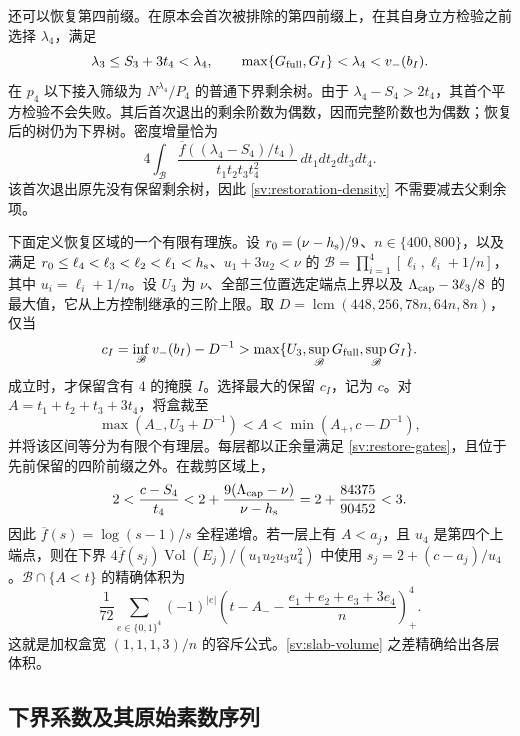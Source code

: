 还可以恢复第四前缀。在原本会首次被排除的第四前缀上，在其自身立方检验之前选择 $\lambda_4$，满足
\begin{equation}\label{sv:restore-gates}
 \lambda_3\le S_3+3t_4<\lambda_4,
 \qquad \max\{G_{\rm full},G_I\}<\lambda_4<v_-(b_I).
\end{equation}
在 $p_4$ 以下接入筛级为 $N^{\lambda_4}/P_4$ 的普通下界剩余树。由于 $\lambda_4-S_4>2t_4$，其首个平方检验不会失败。其后首次退出的剩余阶数为偶数，因而完整阶数也为偶数；恢复后的树仍为下界树。密度增量恰为
\begin{equation}\label{sv:restoration-density}
 4\int_{\mathcal B}
 \frac{\overline f((\lambda_4-S_4)/t_4)}
      {t_1t_2t_3t_4^2}\,dt_1dt_2dt_3dt_4.
\end{equation}
该首次退出原先没有保留剩余树，因此 \eqref{sv:restoration-density} 不需要减去父剩余项。

下面定义恢复区域的一个有限有理族。设 $r_0=(\nu-{h_{\rm s}})/9$、$n\in\{400,800\}$，以及满足 $r_0\le\ell_4<\ell_3<\ell_2<\ell_1<{h_{\rm s}}$、$u_1+3u_2<\nu$ 的 $\mathscr B=\prod_{i=1}^4[\ell_i,\ell_i+1/n]$，其中 $u_i=\ell_i+1/n$。设 $U_3$ 为 $\nu$、全部三位置选定端点上界以及 $\Lambda_{\rm cap}-3\ell_3/8$ 的最大值，它从上方控制继承的三阶上限。取 $D=\operatorname{lcm}(448,256,78n,64n,8n)$，仅当
\[
 c_I=\inf_{\mathscr B} v_-(b_I)-D^{-1}
       >\max\{U_3,\sup_{\mathscr B} G_{\rm full},\sup_{\mathscr B} G_I\}.
\]
成立时，才保留含有 $4$ 的掩膜 $I$。选择最大的保留 $c_I$，记为 $c$。对 $A=t_1+t_2+t_3+3t_4$，将盒裁至
\[
 \max(A_-,U_3+D^{-1})<A<\min(A_+,c-D^{-1}),
\]
并将该区间等分为有限个有理层。每层都以正余量满足 \eqref{sv:restore-gates}，且位于先前保留的四阶前缀之外。在裁剪区域上，
\[
 2<\frac{c-S_4}{t_4}
       <2+\frac{9(\Lambda_{\rm cap}-\nu)}{\nu-{h_{\rm s}}}
       =2+\frac{84375}{90452}<3.
\]
因此 $\overline f(s)=\log(s-1)/s$ 全程递增。若一层上有 $A<a_j$，且 $u_4$ 是第四个上端点，则在下界
$4\overline f(s_j)\operatorname{Vol}(E_j)/(u_1u_2u_3u_4^2)$
中使用 $s_j=2+(c-a_j)/u_4$。$\mathscr B\cap\{A<t\}$ 的精确体积为
\begin{equation}\label{sv:slab-volume}
 \frac1{72}\sum_{e\in\{0,1\}^4}(-1)^{|e|}
 \left(t-A_--\frac{e_1+e_2+e_3+3e_4}{n}\right)_+^4.
\end{equation}
这就是加权盒宽 $(1,1,1,3)/n$ 的容斥公式。\eqref{sv:slab-volume} 之差精确给出各层体积。

\subsection{下界系数及其原始素数序列}

